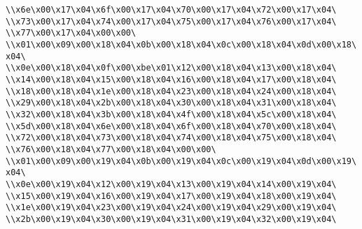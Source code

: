 \verb|\\x6e\x00\x17\x04\x6f\x00\x17\x04\x70\x00\x17\x04\x72\x00\x17\x04\|\newline
\verb|\\x73\x00\x17\x04\x74\x00\x17\x04\x75\x00\x17\x04\x76\x00\x17\x04\|\newline
\verb|\\x77\x00\x17\x04\x00\x00\|\newline
\verb|\\x01\x00\x09\x00\x18\x04\x0b\x00\x18\x04\x0c\x00\x18\x04\x0d\x00\x18\x04\|\newline
\verb|\\x0e\x00\x18\x04\x0f\x00\xbe\x01\x12\x00\x18\x04\x13\x00\x18\x04\|\newline
\verb|\\x14\x00\x18\x04\x15\x00\x18\x04\x16\x00\x18\x04\x17\x00\x18\x04\|\newline
\verb|\\x18\x00\x18\x04\x1e\x00\x18\x04\x23\x00\x18\x04\x24\x00\x18\x04\|\newline
\verb|\\x29\x00\x18\x04\x2b\x00\x18\x04\x30\x00\x18\x04\x31\x00\x18\x04\|\newline
\verb|\\x32\x00\x18\x04\x3b\x00\x18\x04\x4f\x00\x18\x04\x5c\x00\x18\x04\|\newline
\verb|\\x5d\x00\x18\x04\x6e\x00\x18\x04\x6f\x00\x18\x04\x70\x00\x18\x04\|\newline
\verb|\\x72\x00\x18\x04\x73\x00\x18\x04\x74\x00\x18\x04\x75\x00\x18\x04\|\newline
\verb|\\x76\x00\x18\x04\x77\x00\x18\x04\x00\x00\|\newline
\verb|\\x01\x00\x09\x00\x19\x04\x0b\x00\x19\x04\x0c\x00\x19\x04\x0d\x00\x19\x04\|\newline
\verb|\\x0e\x00\x19\x04\x12\x00\x19\x04\x13\x00\x19\x04\x14\x00\x19\x04\|\newline
\verb|\\x15\x00\x19\x04\x16\x00\x19\x04\x17\x00\x19\x04\x18\x00\x19\x04\|\newline
\verb|\\x1e\x00\x19\x04\x23\x00\x19\x04\x24\x00\x19\x04\x29\x00\x19\x04\|\newline
\verb|\\x2b\x00\x19\x04\x30\x00\x19\x04\x31\x00\x19\x04\x32\x00\x19\x04\|\newline
